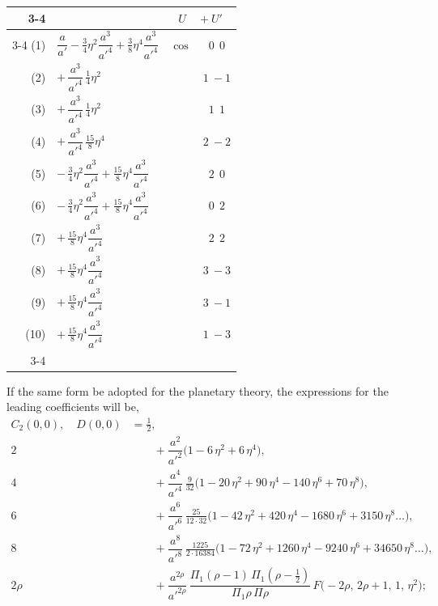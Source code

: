 \documentclass[12pt,a4paper]{article}
\theoremstyle{plain}
\begin{document}
\begin{center}
\begin{tabular}{rl|c|c|}
\cline{3-4}
   &                                                                                      & \multicolumn{2}{c|}{$U\quad+U'$} \\
\cline{3-4}
(1)& $\dfrac{a}{a'}-\tfrac{3}{4}\eta^{2}\dfrac{a^{3}}{a'^{4}}+\tfrac{3}{8}\eta^{4}\dfrac{a^{3}}{a'^{4}}$ & $\cos$ & $0\ \ 0$ \\
(2)& $+\,\dfrac{a^{3}}{a'^{4}}\,\tfrac{1}{4}\eta^{2}$                                     &        & $1\ -1$ \\
(3)& $+\,\dfrac{a^{3}}{a'^{4}}\,\tfrac{1}{4}\eta^{2}$                                     &        & $1\ \ 1$ \\
(4)& $+\,\dfrac{a^{3}}{a'^{4}}\,\tfrac{15}{8}\eta^{4}$                                    &        & $2\ -2$ \\
(5)& $-\,\tfrac{3}{4}\eta^{2}\dfrac{a^{3}}{a'^{4}}+\tfrac{15}{8}\eta^{4}\dfrac{a^{3}}{a'^{4}}$ &    & $2\ \ 0$ \\
(6)& $-\,\tfrac{3}{4}\eta^{2}\dfrac{a^{3}}{a'^{4}}+\tfrac{15}{8}\eta^{4}\dfrac{a^{3}}{a'^{4}}$ &    & $0\ \ 2$ \\
(7)& $+\,\tfrac{15}{8}\eta^{4}\dfrac{a^{3}}{a'^{4}}$                                      &        & $2\ \ 2$ \\
(8)& $+\,\tfrac{15}{8}\eta^{4}\dfrac{a^{3}}{a'^{4}}$                                      &        & $3\ -3$ \\
(9)& $+\,\tfrac{15}{8}\eta^{4}\dfrac{a^{3}}{a'^{4}}$                                      &        & $3\ -1$ \\
(10)& $+\,\tfrac{15}{8}\eta^{4}\dfrac{a^{3}}{a'^{4}}$                                     &        & $1\ -3$ \\
\cline{3-4}
\end{tabular}
\end{center}

\noindent If the same form be adopted for the planetary theory, the expressions for the leading coefficients will be,
\begin{align*}
C_{2}(0,0),\quad D(0,0) &= \tfrac{1}{2},\\
2 &\qquad +\dfrac{a^{2}}{a'^{2}}\bigl(1-6\,\eta^{2}+6\,\eta^{4}\bigr),\\
4 &\qquad +\dfrac{a^{4}}{a'^{4}}\,\tfrac{9}{32}\bigl(1-20\,\eta^{2}+90\,\eta^{4}-140\,\eta^{6}+70\,\eta^{8}\bigr),\\
6 &\qquad +\dfrac{a^{6}}{a'^{6}}\,\tfrac{25}{12\cdot 32}\bigl(1-42\,\eta^{2}+420\,\eta^{4}-1680\,\eta^{6}+3150\,\eta^{8}\ldots\bigr),\\
8 &\qquad +\dfrac{a^{8}}{a'^{8}}\,\tfrac{1225}{2\cdot 16384}\bigl(1-72\,\eta^{2}+1260\,\eta^{4}-9240\,\eta^{6}+34650\,\eta^{8}\ldots\bigr),\\
2\rho &\qquad +\dfrac{a^{2\rho}}{a'^{2\rho}}\,\dfrac{\Pi_{1}(\rho-1)\,\Pi_{1}(\rho-\tfrac{1}{2})}{\Pi_{1}\rho\,\Pi\rho}\,F\bigl(-2\rho,\,2\rho+1,\,1,\,\eta^{2}\bigr);
\end{align*}
\end{document}
